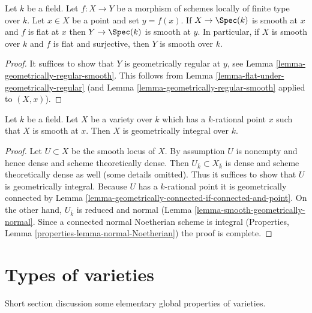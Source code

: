 \begin{lemma}
\label{lemma-flat-under-smooth}
Let $k$ be a field. Let $f : X \to Y$ be a morphism of schemes locally
of finite type over $k$. Let $x \in X$ be a point and set $y = f(x)$.
If $X \to \Spec(k)$ is smooth at $x$ and $f$ is flat at $x$
then $Y \to \Spec(k)$ is smooth at $y$. In particular, if $X$ is
smooth over $k$ and $f$ is flat and surjective, then $Y$ is smooth over $k$.
\end{lemma}

\begin{proof}
It suffices to show that $Y$ is geometrically regular at $y$, see
Lemma \ref{lemma-geometrically-regular-smooth}.
This follows from
Lemma \ref{lemma-flat-under-geometrically-regular}
(and
Lemma \ref{lemma-geometrically-regular-smooth}
applied to $(X, x)$).
\end{proof}

\begin{lemma}
\label{lemma-variety-with-smooth-rational-point}
Let $k$ be a field. Let $X$ be a variety over $k$ which has
a $k$-rational point $x$ such that $X$ is smooth at $x$.
Then $X$ is geometrically integral over $k$.
\end{lemma}

\begin{proof}
Let $U \subset X$ be the smooth locus of $X$. By assumption $U$ is nonempty
and hence dense and scheme theoretically dense. Then
$U_{\overline{k}} \subset X_{\overline{k}}$ is dense and
scheme theoretically dense as well (some details omitted).
Thus it suffices to show that $U$ is geometrically integral.
Because $U$ has a $k$-rational point it is geometrically connected
by Lemma \ref{lemma-geometrically-connected-if-connected-and-point}.
On the other hand, $U_{\overline{k}}$ is reduced and normal
(Lemma \ref{lemma-smooth-geometrically-normal}.
Since a connected normal Noetherian scheme
is integral (Properties, Lemma \ref{properties-lemma-normal-Noetherian})
the proof is complete.
\end{proof}


\section{Types of varieties}
\label{section-types}

\noindent
Short section discussion some elementary global properties of varieties.

